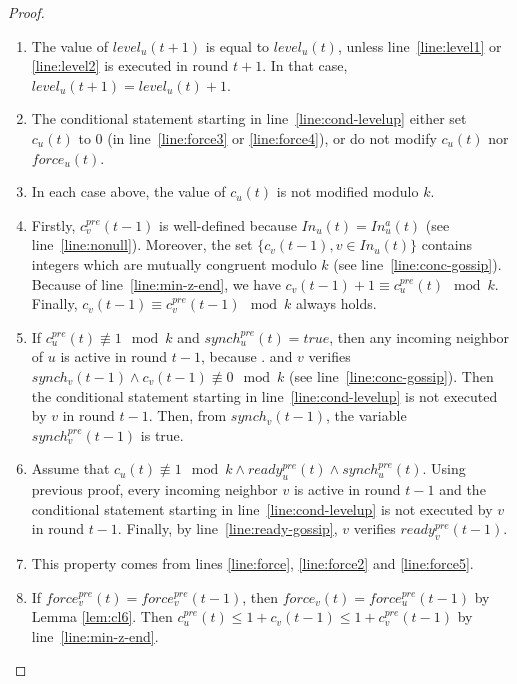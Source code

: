 \documentclass[11pt,letterpaper]{article}
\begin{document}
\begin{proof} \hfill
	\begin{enumerate}[label=\upshape(\alph*),ref=\thethm (\alph*)]
		\item The value of $level_u(t+1)$ is equal to $level_u(t)$, unless line~\ref{line:level1} or \ref{line:level2} is executed in round $t+1$.
			In that case, $level_u(t+1) = level_u(t)+1$.
		\item The conditional statement starting in line~\ref{line:cond-levelup} either set $c_u(t)$ to 0 (in line~\ref{line:force3} or \ref{line:force4}),
			or do not modify $c_u(t)$ nor $force_u(t)$.
		\item In each case above, the value of $c_u(t)$ is not modified modulo $k$.
		\item Firstly, $c_v^{pre}(t-1)$ is well-defined because $In_u(t) = In_u^a(t)$ (see line~\ref{line:nonull}). 
			Moreover, the set $\{c_v(t-1), v \in In_u(t)\}$ contains integers which are mutually congruent modulo $k$ (see line~\ref{line:conc-gossip}).
			Because of line~\ref{line:min-z-end}, we have $c_v(t-1) + 1 \equiv c_u^{pre}(t) \mod k$.
			Finally, $c_v(t-1) \equiv c_v^{pre}(t-1) \mod k$ always holds.
		\item If $c_u^{pre}(t) \not\equiv 1 \mod k$ and $synch_u^{pre}(t) = true$, then any incoming neighbor of $u$ is active in round $t-1$, because .
			and $v$ verifies $synch_v(t-1) \wedge c_v(t-1) \not\equiv 0 \mod k$ (see line~\ref{line:conc-gossip}).
			Then the conditional statement starting in line~\ref{line:cond-levelup} is not executed by $v$ in round $t-1$.
			Then, from $synch_v(t-1)$, the variable $synch_v^{pre}(t-1)$ is true.
		\item Assume that $c_u(t) \not\equiv 1 \mod k \wedge ready_u^{pre}(t) \wedge synch_u^{pre}(t)$.
			Using previous proof, every incoming neighbor $v$ is active in round $t-1$ and
			the conditional statement starting in line~\ref{line:cond-levelup} is not executed by $v$ in round $t-1$.
			Finally, by line~\ref{line:ready-gossip}, $v$ verifies $ready_v^{pre}(t-1)$.
		\item This property comes from lines \ref{line:force}, \ref{line:force2} and \ref{line:force5}.
		\item If $force_v^{pre}(t) = force_v^{pre}(t-1)$, then $force_v(t) = force_u^{pre}(t-1)$ by Lemma \ref{lem:cl6}.
			Then $c_u^{pre}(t) \leq 1+c_v(t-1) \leq 1+c_v^{pre}(t-1)$ by line~\ref{line:min-z-end}.
	\end{enumerate}
\end{proof}
\end{document}
